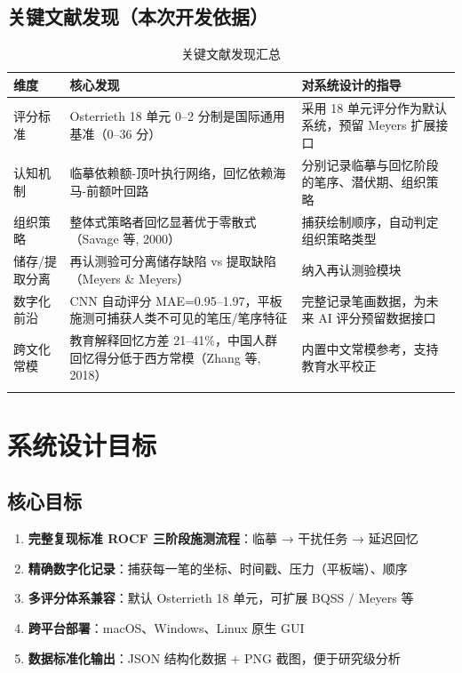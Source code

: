 \documentclass[12pt,a4paper]{ctexart}
\begin{document}
\subsection{关键文献发现（本次开发依据）}

\begin{longtable}{p{4cm} p{5cm} p{5cm}}
\toprule
\textbf{维度} & \textbf{核心发现} & \textbf{对系统设计的指导} \\
\midrule
评分标准 & Osterrieth 18 单元 0--2 分制是国际通用基准（0--36 分） & 采用 18 单元评分作为默认系统，预留 Meyers 扩展接口 \\
\midrule
认知机制 & 临摹依赖额-顶叶执行网络，回忆依赖海马-前额叶回路 & 分别记录临摹与回忆阶段的笔序、潜伏期、组织策略 \\
\midrule
组织策略 & 整体式策略者回忆显著优于零散式（Savage 等, 2000） & 捕获绘制顺序，自动判定组织策略类型 \\
\midrule
储存/提取分离 & 再认测验可分离储存缺陷 vs 提取缺陷（Meyers \& Meyers） & 纳入再认测验模块 \\
\midrule
数字化前沿 & CNN 自动评分 MAE=0.95--1.97，平板施测可捕获人类不可见的笔压/笔序特征 & 完整记录笔画数据，为未来 AI 评分预留数据接口 \\
\midrule
跨文化常模 & 教育解释回忆方差 21--41\%，中国人群回忆得分低于西方常模（Zhang 等, 2018） & 内置中文常模参考，支持教育水平校正 \\
\bottomrule
\caption{关键文献发现汇总}
\end{longtable}

\section{系统设计目标}

\subsection{核心目标}

\begin{enumerate}[leftmargin=*]
  \item \textbf{完整复现标准 ROCF 三阶段施测流程}：临摹 → 干扰任务 → 延迟回忆
  \item \textbf{精确数字化记录}：捕获每一笔的坐标、时间戳、压力（平板端）、顺序
  \item \textbf{多评分体系兼容}：默认 Osterrieth 18 单元，可扩展 BQSS / Meyers 等
  \item \textbf{跨平台部署}：macOS、Windows、Linux 原生 GUI
  \item \textbf{数据标准化输出}：JSON 结构化数据 + PNG 截图，便于研究级分析
\end{enumerate}
\end{document}
